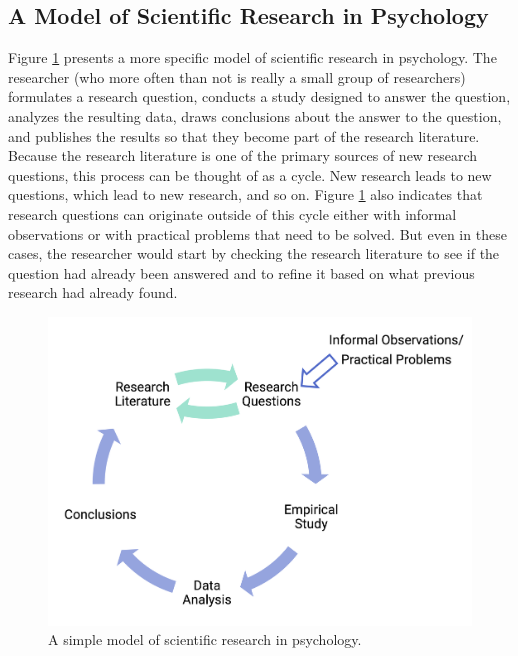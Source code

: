 \documentclass[
]{krantz}
\begin{document}
\hypertarget{a-model-of-scientific-research-in-psychology}{%
\subsection*{A Model of Scientific Research in Psychology}\label{a-model-of-scientific-research-in-psychology}}


Figure \ref{fig:scientificmethod} presents a more specific model of scientific research in psychology. The researcher (who more often than not is really a small group of researchers) formulates a research question, conducts a study designed to answer the question, analyzes the resulting data, draws conclusions about the answer to the question, and publishes the results so that they become part of the research literature. Because the research literature is one of the primary sources of new research questions, this process can be thought of as a cycle. New research leads to new questions, which lead to new research, and so on. Figure \ref{fig:scientificmethod} also indicates that research questions can originate outside of this cycle either with informal observations or with practical problems that need to be solved. But even in these cases, the researcher would start by checking the research literature to see if the question had already been answered and to refine it based on what previous research had already found.

\begin{figure}

{\centering \includegraphics[width=0.7\linewidth]{images/science-of-psych/scientificmethod} 

}

\caption{A simple model of scientific research in psychology.}\label{fig:scientificmethod}
\end{figure}
\end{document}
